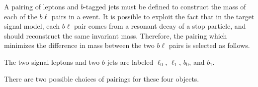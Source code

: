 A pairing of leptons and $b$-tagged jets must be defined to construct the mass
of each of the $b\ell$ pairs in a event.
It is possible to exploit the fact that in the target signal model, each
$b\ell$ pair comes from a resonant decay of a stop particle, and should
reconstruct the same invariant mass.
Therefore, the pairing which minimizes the difference in mass between the two
$b\ell$ pairs is selected as follows.

The two signal leptons and two $b$-jets are labeled $\ell_0$, $\ell_1$, $b_0$,
and $b_1$.

%
\begin{center}
\end{center}
%
There are two possible choices of pairings for these four objects.
%
